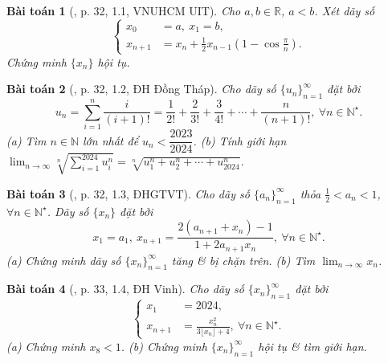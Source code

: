 \documentclass[oneside]{book}
\newtheorem{baitoan}{Bài toán}
\begin{document}
\begin{baitoan}[\cite{VMS_VMC2024}, p. 32, 1.1, VNUHCM UIT]
	Cho $a,b\in\mathbb{R}$, $a < b$. Xét dãy số
	\begin{equation*}
		\left\{\begin{split}
			x_0 &= a,\ x_1 = b,\\
			x_{n+1} &= x_n + \frac{1}{2}x_{n-1}\left(1 - \cos\frac{\pi}{n}\right).
		\end{split}\right.
	\end{equation*}
	Chứng minh $\{x_n\}$ hội tụ.
\end{baitoan}

\begin{baitoan}[\cite{VMS_VMC2024}, p. 32, 1.2, ĐH Đồng Tháp]
	Cho dãy số $\{u_n\}_{n=1}^\infty$ đặt bởi
	\begin{equation*}
		u_n = \sum_{i=1}^n \frac{i}{(i + 1)!} = \frac{1}{2!} + \frac{2}{3!} + \frac{3}{4!} + \cdots + \frac{n}{(n + 1)!},\ \forall n\in\mathbb{N}^\star.
	\end{equation*}
	(a) Tìm $n\in\mathbb{N}$ lớn nhất để $u_n < \dfrac{2023}{2024}$. (b) Tính giới hạn $\lim_{n\to\infty} \sqrt[n]{\sum_{i=1}^{2024} u_i^n} = \sqrt[n]{u_1^n + u_2^n + \cdots + u_{2024}^n}$.
\end{baitoan}

\begin{baitoan}[\cite{VMS_VMC2024}, p. 32, 1.3, ĐHGTVT]
	Cho dãy số $\{a_n\}_{n=1}^\infty$ thỏa $\frac{1}{2} < a_n < 1$, $\forall n\in\mathbb{N}^\star$. Dãy số $\{x_n\}$ đặt bởi
	\begin{equation*}
		x_1 = a_1,\ x_{n+1} = \frac{2(a_{n+1} + x_n) - 1}{1 + 2a_{n+1}x_n},\ \forall n\in\mathbb{N}^\star.
	\end{equation*}
	(a) Chứng minh dãy số $\{x_n\}_{n=1}^\infty$ tăng \& bị chặn trên. (b) Tìm $\lim_{n\to\infty} x_n$.
\end{baitoan}

\begin{baitoan}[\cite{VMS_VMC2024}, p. 33, 1.4, ĐH Vinh]
	Cho dãy số $\{x_n\}_{n=1}^\infty$ đặt bởi
	\begin{equation*}
		\left\{\begin{split}
			x_1 &= 2024,\\
			x_{n+1} &= \frac{x_n^2}{3\lfloor x_n\rfloor + 4},\ \forall n\in\mathbb{N}^\star.
		\end{split}\right.
	\end{equation*}
	(a) Chứng minh $x_8 < 1$. (b) Chứng minh $\{x_n\}_{n=1}^\infty$ hội tụ \& tìm giới hạn.
\end{baitoan}
\end{document}
